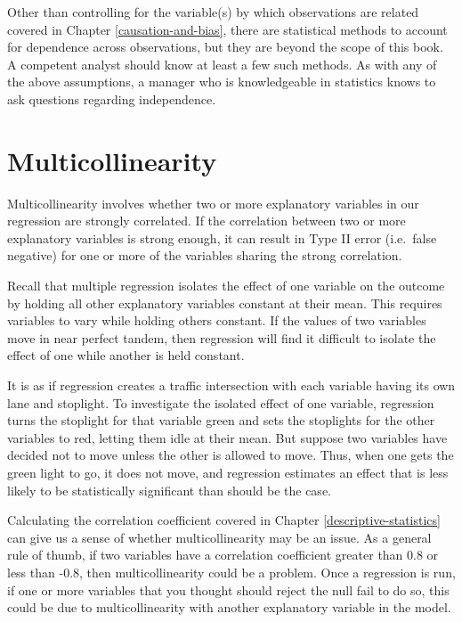 \documentclass[
]{book}
\begin{document}
Other than controlling for the variable(s) by which observations are related covered in Chapter \ref{causation-and-bias}, there are statistical methods to account for dependence across observations, but they are beyond the scope of this book. A competent analyst should know at least a few such methods. As with any of the above assumptions, a manager who is knowledgeable in statistics knows to ask questions regarding independence.

\hypertarget{multicollinearity}{%
\section{Multicollinearity}\label{multicollinearity}}

Multicollinearity involves whether two or more explanatory variables in our regression are strongly correlated. If the correlation between two or more explanatory variables is strong enough, it can result in Type II error (i.e.~false negative) for one or more of the variables sharing the strong correlation.

Recall that multiple regression isolates the effect of one variable on the outcome by holding all other explanatory variables constant at their mean. This requires variables to vary while holding others constant. If the values of two variables move in near perfect tandem, then regression will find it difficult to isolate the effect of one while another is held constant.

It is as if regression creates a traffic intersection with each variable having its own lane and stoplight. To investigate the isolated effect of one variable, regression turns the stoplight for that variable green and sets the stoplights for the other variables to red, letting them idle at their mean. But suppose two variables have decided not to move unless the other is allowed to move. Thus, when one gets the green light to go, it does not move, and regression estimates an effect that is less likely to be statistically significant than should be the case.

Calculating the correlation coefficient covered in Chapter \ref{descriptive-statistics} can give us a sense of whether multicollinearity may be an issue. As a general rule of thumb, if two variables have a correlation coefficient greater than 0.8 or less than -0.8, then multicollinearity could be a problem. Once a regression is run, if one or more variables that you thought should reject the null fail to do so, this could be due to multicollinearity with another explanatory variable in the model.
\end{document}
